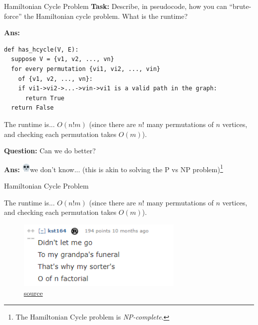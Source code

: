 \documentclass{beamer}
\newcommand{\emojiskull}{\includegraphics[width=12pt]{img/skull.png}}
\begin{document}
\begin{frame}[fragile]{Hamiltonian Cycle Problem}
\textbf{Task:} Describe, in pseudocode, how you can ``brute-force'' the Hamiltonian cycle problem. What is the runtime?

\pause

\textbf{Ans:}
\begin{verbatim}
def has_hcycle(V, E):
  suppose V = {v1, v2, ..., vn}
  for every permutation {vi1, vi2, ..., vin} 
    of {v1, v2, ..., vn}:
    if vi1->vi2->...->vin->vi1 is a valid path in the graph:
      return True
  return False
\end{verbatim}

The runtime is... \pause $O(n! m)$ (since there are $n!$ many permutations of $n$ vertices, and checking each permutation takes $O(m)$).
\pause

\textbf{Question:} Can we do better?

\textbf{Ans:} \emojiskull we don't know... (this is akin to solving the P vs NP problem)\footnote{The Hamiltonian Cycle problem is \textit{NP-complete}.}

\end{frame}

\begin{frame}{Hamiltonian Cycle Problem}

The runtime is... $O(n! m)$ (since there are $n!$ many permutations of $n$ vertices, and checking each permutation takes $O(m)$).

\begin{figure}
    \centering
    \includegraphics[width=8cm]{img/factorial_time.png}
    \caption*{\color{blue}\href{https://www.reddit.com/r/ProgrammerHumor/comments/n8bgw1/boss_makes_a_dollar_i_make_a_dime/}{source}}
\end{figure}

\end{frame}
\end{document}
